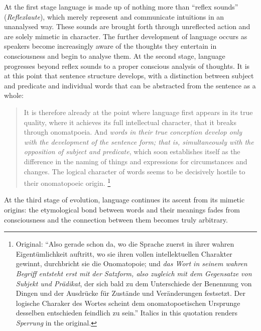 \documentclass[output=paper]{langscibook}
\begin{document}
At the first stage language is made up of nothing more than ``reflex sounds'' (\emph{Reflexlaute}), which merely represent and communicate intuitions in an unanalysed way. These sounds are brought forth through unreflected action and are solely mimetic in character. The further development of language occurs as speakers become increasingly aware of the thoughts they entertain in consciousness and begin to analyse them. At the second stage, language progresses beyond reflex sounds to a proper conscious analysis of thoughts. It is at this point that sentence structure develops, with a distinction between subject and predicate and individual words that can be abstracted from the sentence as a whole:

\begin{quotation}
It is therefore already at the point where language first appears in its true quality, where it achieves its full intellectual character, that it breaks through onomatpoeia. And \emph{words in their true conception develop only with the development of the sentence form; that is, simultaneously with the opposition of subject and predicate}, which soon establishes itself as the difference in the naming of things and expressions for circumstances and changes. The logical character of words seems to be decisively hostile to their onomatopoeic origin. \citep[424-425]{Steinthal1881}\footnote{Original: ``Also gerade schon da, wo die Sprache zuerst in ihrer wahren Eigentümlichkeit auftritt, wo sie ihren vollen intellektuellen Charakter gewinnt, durchbricht sie die Onomatopoie; und \emph{das Wort in seinem wahren Begriff entsteht erst mit der Satzform, also zugleich mit dem Gegensatze von Subjekt und Prädikat}, der sich bald zu dem Unterschiede der Benennung von Dingen und der Ausdrücke für Zustände und Veränderungen festsetzt. Der logische Charaker des Wortes scheint dem onomatopoetischen Ursprunge desselben entschieden feindlich zu sein.'' Italics in this quotation renders \emph{Sperrung} in the original.}
\end{quotation}

At the third stage of evolution, language continues its ascent from its mimetic origins: the etymological bond between words and their meanings fades from consciousness and the connection between them becomes truly arbitrary.
\end{document}
